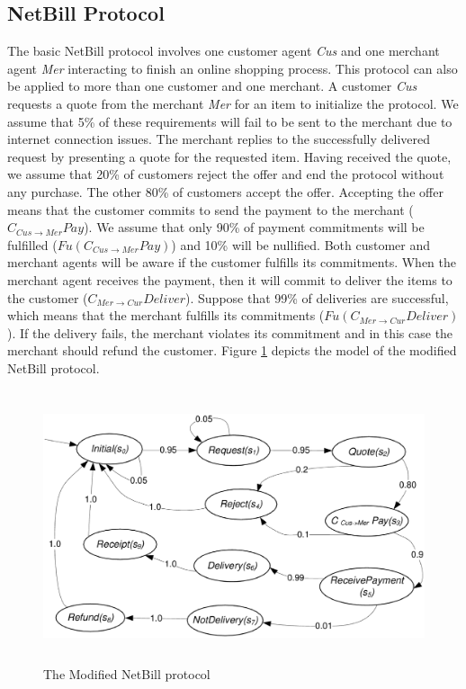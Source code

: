 \subsection{NetBill Protocol}

The basic NetBill protocol involves one customer agent \emph{Cus} and one
merchant agent \emph{Mer} interacting to finish an online shopping
process. This protocol can also be applied to more than one
customer and one merchant. A customer \emph{Cus} requests a quote
from the merchant \emph{Mer} for an item to initialize the
protocol. We assume that 5\% of these requirements will fail to be
sent to the merchant due to internet connection issues. The
merchant replies to the successfully delivered request by
presenting a quote for the requested item. Having received the quote, we assume that 20\% of customers reject the offer and
end the protocol without any purchase. The other 80\% of customers
accept the offer. Accepting the offer means that the customer commits to send the payment to the merchant ($C_{Cus\rightarrow Mer}Pay$). We assume that only 90\% of payment commitments will be fulfilled
($Fu(C_{Cus\rightarrow Mer}Pay)$) and 10\% will be nullified. Both
customer and merchant agents will be aware if the customer
fulfills its commitments. When the merchant agent receives the
payment, then it will commit to deliver the items to the customer
($C_{Mer\rightarrow Cur}Deliver$). Suppose that 99\% of deliveries
are successful, which means that the merchant fulfills its
commitments ($Fu(C_{Mer\rightarrow Cur}Deliver)$). If the delivery fails,
the merchant violates its commitment and in this case the merchant should refund the customer. Figure \ref{NetBill} depicts the model of the modified NetBill protocol.

\begin{figure}[!h]
\begin{center}
\includegraphics[width=14cm,height=8cm]{chap4/img/Netbill.eps}
\caption{The Modified NetBill protocol} \label{NetBill}
\end{center}
\end{figure}


